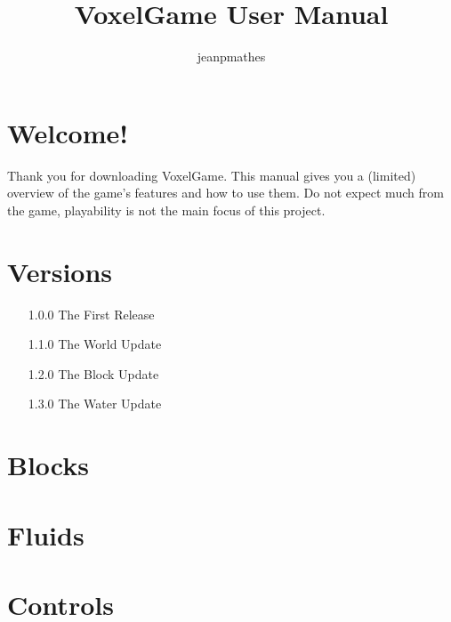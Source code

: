 \documentclass{article}
\begin{document}
    \title{VoxelGame User Manual}
    \author{jeanpmathes}

    \maketitle
    \newpage

    \tableofcontents
    \newpage


    \section{Welcome!}\label{sec:welcome!}

    Thank you for downloading VoxelGame.
    This manual gives you a (limited) overview of the game's features and how to use them.
    Do not expect much from the game, playability is not the main focus of this project.


    \section{Versions}\label{sec:versions}

    \begin{enumerate}
        \item[1.0.0] The First Release
        \item[1.1.0] The World Update
        \item[1.2.0] The Block Update
        \item[1.3.0] The Water Update
    \end{enumerate}


    \section{Blocks}\label{sec:blocks}

    


    \section{Fluids}\label{sec:fluids}

    


    \section{Controls}\label{sec:controls}

    
\end{document}
